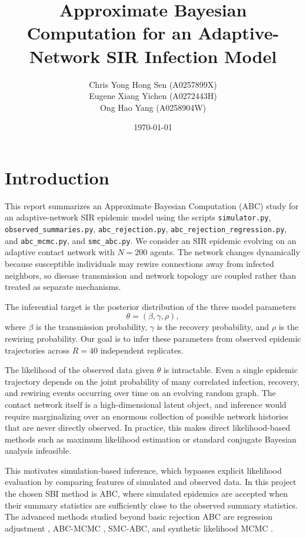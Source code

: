 \documentclass[11pt]{article}
\title{Approximate Bayesian Computation for an Adaptive-Network SIR Infection Model}
\author{
Chris Yong Hong Sen (A0257899X) \\
Eugene Xiang Yichen (A0272443H) \\
Ong Hao Yang (A0258904W)
}
\date{\today}
\begin{document}
\maketitle
\tableofcontents

\section{Introduction}

This report summarizes an Approximate Bayesian Computation (ABC) study for an adaptive-network SIR epidemic model using the scripts
\texttt{simulator.py},
\texttt{observed\_summaries.py},
\texttt{abc\_rejection.py},
\texttt{abc\_rejection\_regression.py}, and
\texttt{abc\_mcmc.py}, and
\texttt{smc\_abc.py}.
We consider an SIR epidemic evolving on an adaptive contact network with $N = 200$ agents. The network changes dynamically because susceptible individuals may rewire connections away from infected neighbors, so disease transmission and network topology are coupled rather than treated as separate mechanisms.

The inferential target is the posterior distribution of the three model parameters
\[
\theta = (\beta,\gamma,\rho),
\]
where $\beta$ is the transmission probability, $\gamma$ is the recovery probability, and $\rho$ is the rewiring probability. Our goal is to infer these parameters from observed epidemic trajectories across $R = 40$ independent replicates.

The likelihood of the observed data given $\theta$ is intractable. Even a single epidemic trajectory depends on the joint probability of many correlated infection, recovery, and rewiring events occurring over time on an evolving random graph. The contact network itself is a high-dimensional latent object, and inference would require marginalizing over an enormous collection of possible network histories that are never directly observed. In practice, this makes direct likelihood-based methods such as maximum likelihood estimation or standard conjugate Bayesian analysis infeasible.

This motivates simulation-based inference, which bypasses explicit likelihood evaluation by comparing features of simulated and observed data. In this project the chosen SBI method is ABC, where simulated epidemics are accepted when their summary statistics are sufficiently close to the observed summary statistics. The advanced methods studied beyond basic rejection ABC are regression adjustment \citep{beaumont2002}, ABC-MCMC \citep{marjoram2003}, SMC-ABC, and synthetic likelihood MCMC \citep{wood2010}.
\end{document}
